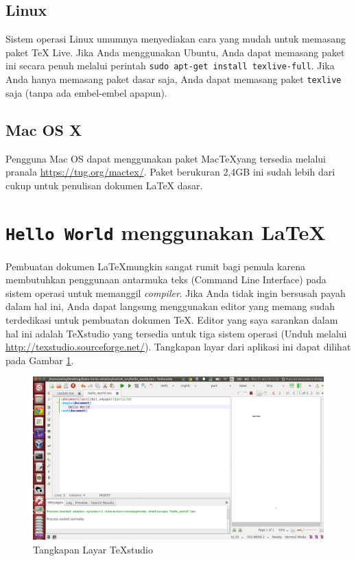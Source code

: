 \documentclass{ta-its}
\begin{document}
        
        \subsection{Linux}
        
        Sistem operasi Linux umumnya menyediakan cara yang mudah untuk memasang paket \TeX{} Live. Jika Anda menggunakan Ubuntu, Anda dapat memasang paket ini secara penuh melalui perintah \texttt{sudo apt-get install texlive-full}. Jika Anda hanya memasang paket dasar saja, Anda dapat memasang paket \texttt{texlive} saja (tanpa ada embel-embel apapun).
        
        \subsection{Mac OS X}
        Pengguna Mac OS dapat menggunakan paket Mac\TeX yang tersedia melalui pranala \url{https://tug.org/mactex/}. Paket berukuran 2,4GB ini sudah lebih dari cukup untuk penulisan dokumen La\TeX{} dasar.
        
        
        \section{\texttt{Hello World} menggunakan \LaTeX{}}
        Pembuatan dokumen La\TeX mungkin sangat rumit bagi pemula karena membutuhkan penggunaan antarmuka teks (Command Line Interface) pada sistem operasi untuk memanggil \emph{compiler}. Jika Anda tidak ingin bersusah payah dalam hal ini, Anda dapat langsung menggunakan editor yang memang sudah terdedikasi untuk pembuatan dokumen \TeX{}. Editor yang saya sarankan dalam hal ini adalah \TeX{}studio yang tersedia untuk tiga sistem operasi (Unduh melalui \url{http://texstudio.sourceforge.net/}). Tangkapan layar dari aplikasi ini dapat dilihat pada Gambar \ref{gambarTexStudio}.
        
        \begin{figure}[h] %
			\centering
			\includegraphics[width=\linewidth]{contoh_img/texstudio}
			\caption{Tangkapan Layar \TeX{}studio}
			\label{gambarTexStudio}
		\end{figure}
\end{document}
